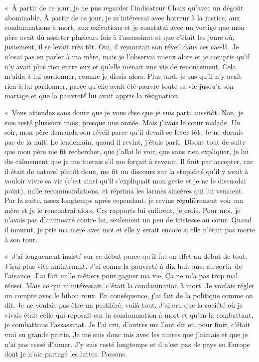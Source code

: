 \documentclass[french,twoside]{book} %
\begin{document}
« À partir de ce jour, je ne pus regarder l’indicateur Chaix qu’avec un dégoût abominable. À partir de ce jour, je m’intéressai avec horreur à la justice, aux condamnations à mort, aux exécutions et je constatai avec un vertige que mon père avait dû assister plusieurs fois à l’assassinat et que c’était les jours où, justement, il se levait très tôt. Oui, il remontait son réveil dans ces cas-là. Je n’osai pas en parler à ma mère, mais je l’observai mieux alors et je compris qu’il n’y avait plus rien entre eux et qu’elle menait une vie de renoncement. Cela m’aida à lui pardonner, comme je disais alors. Plus tard, je sus qu’il n’y avait rien à lui pardonner, parce qu’elle avait été pauvre toute sa vie jusqu’à son mariage et que la pauvreté lui avait appris la résignation.\par
« Vous attendez sans doute que je vous dise que je suis parti aussitôt. Non, je suis resté plusieurs mois, presque une année. Mais j’avais le cœur malade. Un soir, mon père demanda son réveil parce qu’il devait se lever tôt. Je ne dormis pas de la nuit. Le lendemain, quand il revint, j’étais parti. Disons tout de suite que mon père me fit rechercher, que j’allai le voir, que sans rien expliquer, je lui dis calmement que je me tuerais s’il me forçait à revenir. Il finit par accepter, car il était de naturel plutôt doux, me fit un discours sur la stupidité qu’il y avait à vouloir vivre sa vie (c’est ainsi qu’il s’expliquait mon geste et je ne le dissuadai point), mille recommandations, et réprima les larmes sincères qui lui venaient. Par la suite, assez longtemps après cependant, je revins régulièrement voir ma mère et je le rencontrai alors. Ces rapports lui suffirent, je crois. Pour moi, je n’avais pas d’animosité contre lui, seulement un peu de tristesse au cœur. Quand il mourut, je pris ma mère avec moi et elle y serait encore si elle n’était pas morte à son tour.\par
« J’ai longuement insisté sur ce début parce qu’il fut en effet au début de tout. J’irai plus vite maintenant. J’ai connu la pauvreté à dix-huit ans, au sortir de l’aisance. J’ai fait mille métiers pour gagner ma vie. Ça ne m’a pas trop mal réussi. Mais ce qui m’intéressait, c’était la condamnation à mort. Je voulais régler un compte avec le hibou roux. En conséquence, j’ai fait de la politique comme on dit. Je ne voulais pas être un pestiféré, voilà tout. J’ai cru que la société où je vivais était celle qui reposait sur la condamnation à mort et qu’en la combattant, je combattrais l’assassinat. Je l’ai cru, d’autres me l’ont dit et, pour finir, c’était vrai en grande partie. Je me suis donc mis avec les autres que j’aimais et que je n’ai pas cessé d’aimer. J’y suis resté longtemps et il n’est pas de pays en Europe dont je n’aie partagé les luttes. Passons.\par
\end{document}
